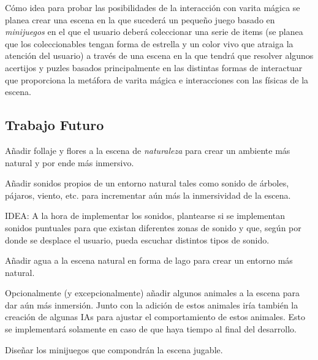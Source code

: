 \documentclass[12pt,a4paper]{article}
\begin{document}
Cómo idea para probar las posibilidades de la interacción con varita mágica se planea crear una escena en la que sucederá un pequeño juego basado en \textit{minijuegos} en el que el usuario deberá coleccionar una serie de items (se planea que los coleccionables tengan forma de estrella y un color vivo que atraiga la atención del usuario) a través de una escena en la que tendrá que resolver algunos acertijos y puzles basados principalmente en las distintas formas de interactuar que proporciona la metáfora de varita mágica e interacciones con las físicas de la escena.

\subsection{Trabajo Futuro}

Añadir follaje y flores a la escena de \textit{naturaleza} para crear un ambiente más natural y por ende más inmersivo.

Añadir sonidos propios de un entorno natural tales como sonido de árboles, pájaros, viento, etc. para incrementar aún más la inmersividad de la escena.

IDEA: A la hora de implementar los sonidos, plantearse si se implementan sonidos puntuales para que existan diferentes zonas de sonido y que, según por donde se desplace el usuario, pueda escuchar distintos tipos de sonido.

Añadir agua a la escena natural en forma de lago para crear un entorno más natural.

Opcionalmente (y excepcionalmente) añadir algunos animales a la escena para dar aún más inmersión. Junto con la adición de estos animales iría también la creación de algunas IAs para ajustar el comportamiento de estos animales. Esto se implementará solamente en caso de que haya tiempo al final del desarrollo.

Diseñar los minijuegos que compondrán la escena jugable.

\break
\end{document}
